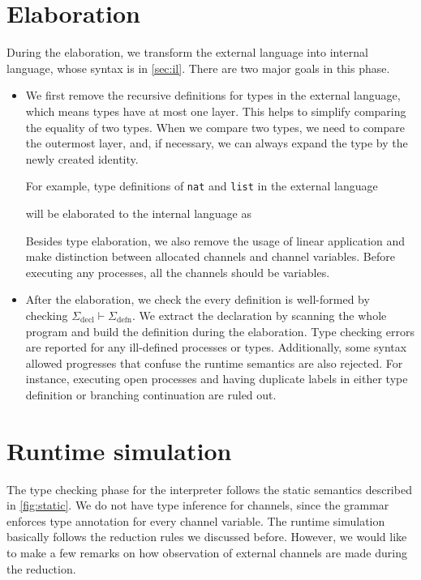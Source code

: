\documentclass[12pt, openany]{memoir}
\begin{document}
\section{Elaboration}
During the elaboration, we transform the external language into internal language, whose syntax is in \cref{sec:il}. There are two major goals in this phase.
\begin{itemize}
  \item We first remove the recursive definitions for types in the external language, which means types have at most one layer.
  This helps to simplify comparing the equality of two types. When we compare two types, we need to compare the outermost layer,
  and, if necessary, we can always expand the type by the newly created identity.

  For example, type definitions of \texttt{nat} and \texttt{list} in the external language 
  
  will be elaborated to the internal language as
  
  Besides type elaboration, we also remove the usage of linear application and make distinction between allocated channels and channel variables.
  Before executing any processes, all the channels should be variables.
  \item After the elaboration, we check the every definition is well-formed by checking $\Sigma_\text{decl} \vdash \Sigma_\text{defn}$.
  We extract the declaration by scanning the whole program and build the definition during the elaboration.
  Type checking errors are reported for any ill-defined processes or types. 
  Additionally, some syntax allowed progresses that confuse the runtime semantics are also rejected.
  For instance, executing open processes and having duplicate labels in either type definition or branching continuation are ruled out.
\end{itemize}
\section{Runtime simulation}
The type checking phase for the interpreter follows the static semantics described in \cref{fig:static}.
We do not have type inference for channels, since the grammar enforces type annotation for every channel variable.
The runtime simulation basically follows the reduction rules we discussed before. However, we would like to make a few remarks on how observation of external channels are made during the reduction.
\end{document}
